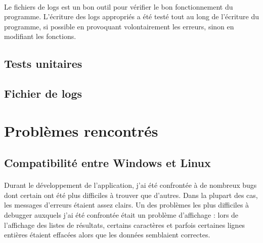 \documentclass{article}
\begin{document}
    \paragraph{}
    Le fichiers de logs est un bon outil pour vérifier le bon fonctionnement du programme. L'écriture des logs appropriés a été testé tout au long de l'écriture du programme, si possible en provoquant volontairement les erreurs, sinon en modifiant les fonctions.


    \paragraph{}





    \subsection{Tests unitaires}

    \subsection{Fichier de logs}

    \subsection{}

    

    \newpage
    \section{Problèmes rencontrés}

    \subsection{Compatibilité entre Windows et Linux}
    \paragraph{}
    Durant le développement de l'application, j'ai été confrontée à de nombreux bugs dont certain ont été plus difficiles à trouver que d'autres. Dans la plupart des cas, les messages d'erreurs étaient assez clairs. Un des problèmes les plus difficiles à debugger auxquels j'ai été confrontée était un problème d'affichage : lors de l'affichage des listes de résultats, certains caractères et parfois certaines lignes entières étaient effacées alors que les données semblaient correctes.
\end{document}
